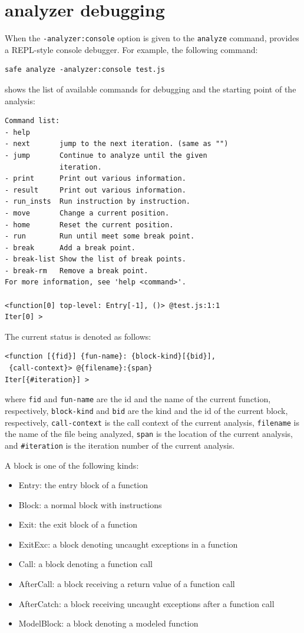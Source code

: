 \section{\safe analyzer debugging}
When the \verb!-analyzer:console! option is given to the \texttt{analyze} command,
\safe provides a REPL-style console debugger.
For example, the following command:
\begin{verbatim}
safe analyze -analyzer:console test.js
\end{verbatim}
shows the list of available commands for debugging and
the starting point of the analysis:
{\small
\begin{verbatim}
Command list:
- help           
- next       jump to the next iteration. (same as "")
- jump       Continue to analyze until the given
             iteration.
- print      Print out various information.
- result     Print out various information.
- run_insts  Run instruction by instruction.
- move       Change a current position.
- home       Reset the current position.
- run        Run until meet some break point.
- break      Add a break point.
- break-list Show the list of break points.
- break-rm   Remove a break point.
For more information, see 'help <command>'.

<function[0] top-level: Entry[-1], ()> @test.js:1:1
Iter[0] > 
\end{verbatim}
}

The current status is denoted as follows:
{\small
\begin{verbatim}
<function [{fid}] {fun-name}: {block-kind}[{bid}],
 {call-context}> @{filename}:{span}
Iter[{#iteration}] >
\end{verbatim}
}
\noindent
where \verb!fid! and \verb!fun-name! are the id and the name of the current function,
respectively, \verb!block-kind! and \verb!bid!
are the kind and the id of the current block, respectively,
\verb!call-context! is the call context of the current analysis,
\verb!filename! is the name of the file being analyzed,
\verb!span! is the location of the current analysis, and
\verb!#iteration! is the iteration number of the current analysis.

A block is one of the following kinds:
\begin{itemize}
\itemsep-.1em
\item Entry: the entry block of a function
\item Block: a normal block with instructions
\item Exit: the exit block of a function
\item ExitExc: a block denoting uncaught exceptions in a function
\item Call: a block denoting a function call
\item AfterCall: a block receiving a return value of a function call
\item AfterCatch: a block receiving uncaught exceptions after a function call
\item ModelBlock: a block denoting a modeled function
\end{itemize}

